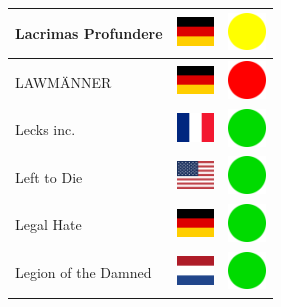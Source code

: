 \documentclass[12pt, a4paper, twoside]{report}
\begin{document}
\begin{center}
\begin{longtable}{|p{5cm}|p{2cm}|p{2cm}|}
 Lacrimas Profundere                                        & \includegraphics[width=1cm]{../img/flags/de} &   \includegraphics[width=1cm]{../likes/m} \\ \hline
 LAWMÄNNER                                                  & \includegraphics[width=1cm]{../img/flags/de} &   \includegraphics[width=1cm]{../likes/n} \\ \hline
 Lecks inc.                                                 & \includegraphics[width=1cm]{../img/flags/fr} &   \includegraphics[width=1cm]{../likes/y} \\ \hline
 Left to Die                                                & \includegraphics[width=1cm]{../img/flags/us} &   \includegraphics[width=1cm]{../likes/y} \\ \hline
 Legal Hate                                                 & \includegraphics[width=1cm]{../img/flags/de} &   \includegraphics[width=1cm]{../likes/y} \\ \hline
 Legion of the Damned                                       & \includegraphics[width=1cm]{../img/flags/nl} &   \includegraphics[width=1cm]{../likes/y} \\ \hline

\end{longtable}
\end{center}
\end{document}
